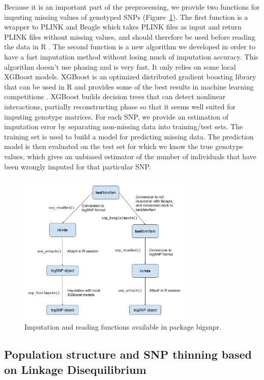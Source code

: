 \documentclass{bioinfo}
\begin{document}
Because it is an important part of the preprocessing, we provide two functions for imputing missing values of genotyped SNPs (Figure~\ref{fig:impute}). The first function is a wrapper to PLINK and Beagle which takes PLINK files as input and return PLINK files without missing values, and should therefore be used before reading the data in R \cite[]{Browning2009}. The second function is a new algorithm we developed in order to have a fast imputation method without losing much of imputation accuracy. This algorithm doesn't use phasing and is very fast. It only relies on some local XGBoost models. XGBoost is an optimized distributed gradient boosting library that can be used in R and provides some of the best results in machine learning competitions \cite[]{Chen2016}. XGBoost builds decision trees that can detect nonlinear interactions, partially reconstructing phase so that it seems well suited for imputing genotype matrices. For each SNP, we provide an estimation of imputation error by separating non-missing data into training/test sets. The training set is used to build a model for predicting missing data. The prediction model is then evaluated on the test set for which we know the true genotype values, which gives an unbiased estimator of the number of individuals that have been wrongly imputed for that particular SNP.

\begin{figure}[!tpb]
\centerline{\includegraphics[width=235pt]{imputation.pdf}}
\caption{Imputation and reading functions available in package bigsnpr.}\label{fig:impute}
\end{figure}


\subsection{Population structure and SNP thinning based on Linkage Disequilibrium} 
\end{document}
